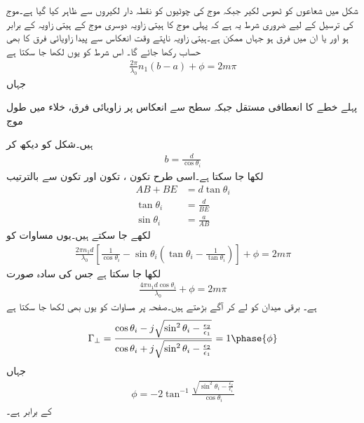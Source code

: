 شکل  میں شعاعوں کو ٹھوس لکیر جبکہ موج کی چوٹیوں کو نقطہ دار لکیروں سے ظاہر کیا گیا ہے۔موج کی ترسیل کے لیے ضروری شرط یہ ہے کہ پہلی موج کا ہیتی زاویہ  دوسری موج کے ہیتی زاویہ  کے برابر ہو اور یا ان میں فرق  ہو جہاں  ممکن ہے۔ہیتی زاویہ ناپتے وقت انعکاس سے پیدا زاویائی فرق کا بھی حساب رکھا جائے گا۔ اس شرط کو یوں لکھا جا سکتا ہے
\begin{align}\label{مساوات_مویج_تختے_میں_ممکن_زاویے}
\frac{2\pi}{\lambda_0} n_1 (b-a)+\phi=2 m\pi
\end{align}
جہاں
\begin{description}
 پہلے خطے کا  انعطافی مستقل  جبکہ
 سطح سے انعکاس پر  زاویائی فرق،
 خلاء میں طول موج
\end{description}
ہیں۔شکل  کو دیکھ کر
\begin{align}
b=\frac{d}{\cos \theta_i}
\end{align}
لکھا جا سکتا ہے۔اسی طرح تکون ، تکون  اور تکون  سے بالترتیب  
\begin{align*}
AB+BE&=d\tan \theta_i\\
\tan \theta_i&=\frac{d}{BE}\\
\sin\theta_i &=\frac{a}{AB}
\end{align*}
لکھے جا سکتے ہیں۔یوں مساوات  کو
\begin{align}
\frac{2\pi n_1 d}{\lambda_0} \left[\frac{1}{\cos \theta_i}-\sin \theta_i \left(\tan \theta_i-\frac{1}{\tan \theta_i} \right) \right]+\phi=2 m \pi
\end{align}
لکھا جا سکتا ہے جس کی سادہ صورت
\begin{align}\label{مساوات_مویج_تختہ_ت}
\frac{4\pi n_1 d \cos \theta_i}{\lambda_0}+\phi=2 m \pi
\end{align}
ہے۔ برقی میدان  کو لے کر آگے بڑھتے ہیں۔صفحہ  پر مساوات  کو یوں بھی لکھا جا سکتا ہے
\begin{align}\label{مساوات_مویج_تختہ_ٹ}
\Gamma_{\perp}=\frac{\cos \theta_i-j \sqrt{\sin^2 \theta_i-\frac{\epsilon_2}{\epsilon_1}}}{\cos \theta_i+j \sqrt{\sin^2 \theta_i-\frac{\epsilon_2}{\epsilon_1}}}=1\phase{\phi}
\end{align}
جہاں
\begin{align}
\phi=-2\tan^{-1} \frac{\sqrt{\sin^2 \theta_i -\frac{\epsilon_2}{\epsilon_1}} }{\cos \theta_i}
\end{align}
کے برابر ہے۔

